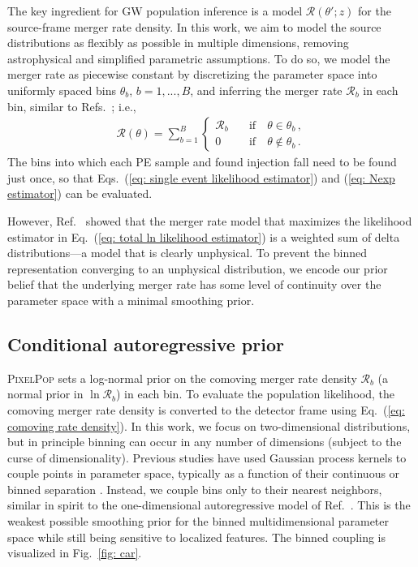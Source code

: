 \begin{refsection}
The key ingredient for GW population inference is a model $\mathcal{R}(\theta';z)$ for the source-frame merger rate density. In this work, we aim to model the source distributions as flexibly as possible in multiple dimensions, removing astrophysical and simplified parametric assumptions. To do so, we model the merger rate as piecewise constant by discretizing the parameter space into uniformly spaced bins $\theta_b$, $b=1,...,B$, and inferring the merger rate $\mathcal{R}_b$ in each bin, similar to Refs.~\cite{KAGRA:2021duu, Mandel:2016prl, Vitale:2018yhm, Ng:2020qpk, Ng:2022agi, Ray:2023upk, MaganaHernandez:2024uty, Ray:2024hos}; i.e.,
\begin{align}
\label{eq: binned rate}
\mathcal{R}(\theta)
=
\sum_{b=1}^B
\begin{cases}
\mathcal{R}_b \quad & \mathrm{if} \quad \theta \in \theta_b \, ,
\\
0 \quad & \mathrm{if} \quad \theta \notin \theta_b \, .
\end{cases}
\end{align}
The bins into which each PE sample and found injection fall need to be found just once, so that Eqs.~(\ref{eq: single event likelihood estimator}) and (\ref{eq: Nexp estimator}) can be evaluated.

However, Ref.~\cite{Payne:2022xan} showed that the merger rate model that maximizes the likelihood estimator in Eq.~(\ref{eq: total ln likelihood estimator}) is a weighted sum of delta distributions---a model that is clearly unphysical. To prevent the binned representation converging to an unphysical distribution, we encode our prior belief that the underlying merger rate has some level of continuity over the parameter space with a minimal smoothing prior.

\subsection{Conditional autoregressive prior}
\label{sec: ppmethods Conditional autoregressive prior}

\textsc{PixelPop} sets a log-normal prior on the comoving merger rate density $\mathcal{R}_b$ (a normal prior in $\ln\mathcal{R}_b$) in each bin. To evaluate the population likelihood, the comoving merger rate density is converted to the detector frame using Eq.~(\ref{eq: comoving rate density}). In this work, we focus on two-dimensional distributions, but in principle binning can occur in any number of dimensions (subject to the curse of dimensionality). Previous studies have used Gaussian process kernels to couple points in parameter space, typically as a function of their continuous or binned separation \cite{Foreman-Mackey_2014, Mandel:2016prl, Vitale:2018yhm, Ng:2020qpk, Ng:2022agi, Ray:2023upk, KAGRA:2021duu, Farah:2024xub}. Instead, we couple bins only to their nearest neighbors, similar in spirit to the one-dimensional autoregressive model of Ref.~\cite{Callister:2023tgi}. This is the weakest possible smoothing prior for the binned multidimensional parameter space while still being sensitive to localized features. The binned coupling is visualized in Fig.~\ref{fig: car}.


\end{refsection}
